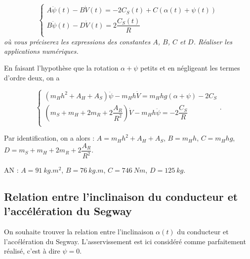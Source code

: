 $$
\left\{
\begin{array}{l}
A \ddot{\psi}(t) - B \dot{V}(t) = - 2C_S(t)+C\left(\alpha(t) + \psi(t)\right) \\
B \ddot{\psi}(t) - D \dot{V}(t) = 2\dfrac{C_S(t)}{R} \\\end{array}
\right.
$$
\textit{où vous préciserez les expressions des constantes $A$, $B$, $C$ et $D$. Réaliser les applications numériques.}
\ifprof
\begin{corrige}
En faisant l'hypothèse que la rotation $\alpha+\psi$ petits et en négligeant les termes d'ordre deux, on a 

$$
\left\{
\begin{array}{l}
\left( m_H h^2 +A_H + A_S\right)\ddot{\psi} - m_H h \dot{V}  = m_H hg \left(\alpha + \psi\right) - 2C_S \\
\left( m_S +m_H + 2m_R + 2\dfrac{A_R}{R^2}\right)\dot{V} - m_H h \ddot{\psi} =  - 2\dfrac{C_S}{R}  \\
\end{array}
\right. .
$$

Par identification, on a alors : $A= m_H h^2 +A_H + A_S$, $B = m_H h$, $C= m_H hg$, $D= m_S +m_H + 2m_R + 2\dfrac{A_R}{R^2}$.

AN : $A=\SI{91}{kg.m^2}$, $B=\SI{76}{kg.m}$, $C=\SI{746}{Nm}$, $D=\SI{125}{kg}$.
\end{corrige}
\else
\fi


\subsection{Relation entre l’inclinaison du conducteur et l’accélération du Segway}

On souhaite trouver la relation entre l’inclinaison $\alpha(t)$ du conducteur et l’accélération du Segway. L’asservissement est ici considéré comme parfaitement réalisé, c’est à dire $\psi=0$.

